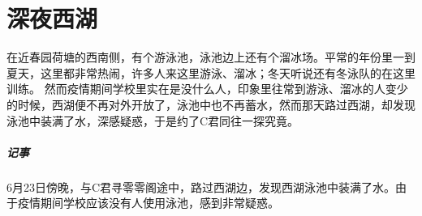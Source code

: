 \chapter{深夜西湖}

在近春园荷塘的西南侧，有个游泳池，泳池边上还有个溜冰场。平常的年份里一到夏天，这里都非常热闹，许多人来这里游泳、溜冰；冬天听说还有冬泳队的在这里训练。
然而疫情期间学校里实在是没什么人，印象里往常到游泳、溜冰的人变少的时候，西湖便不再对外开放了，泳池中也不再蓄水，然而那天路过西湖，却发现泳池中装满了水，深感疑惑，于是约了C君同往一探究竟。


\vfill

\paragraph{记事}
6月23日傍晚，与C君寻零零阁途中，路过西湖边，发现西湖泳池中装满了水。由于疫情期间学校应该没有人使用泳池，感到非常疑惑。

